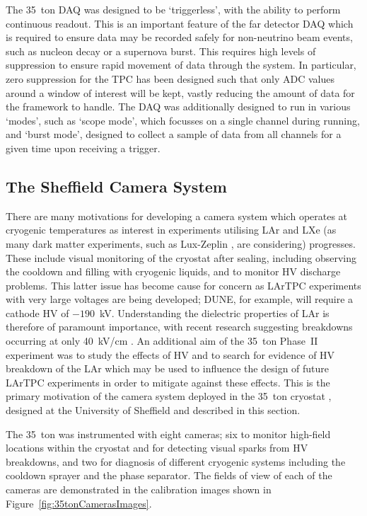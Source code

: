 The 35~ton DAQ was designed to be `triggerless', with the ability to perform continuous readout.  This is an important feature of the far detector DAQ which is required to ensure data may be recorded safely for non-neutrino beam events, such as nucleon decay or a supernova burst.  This requires high levels of suppression to ensure rapid movement of data through the system.  In particular, zero suppression for the TPC has been designed such that only ADC values around a window of interest will be kept, vastly reducing the amount of data for the framework to handle.  The DAQ was additionally designed to run in various `modes', such as `scope mode', which focusses on a single channel during running, and `burst mode', designed to collect a sample of data from all channels for a given time upon receiving a trigger.

\subsection{The Sheffield Camera System}\label{sec:SheffieldCameras}

There are many motivations for developing a camera system which operates at cryogenic temperatures as interest in experiments utilising LAr and LXe (as many dark matter experiments, such as Lux-Zeplin \cite{LZCDR2015}, are considering) progresses.  These include visual monitoring of the cryostat after sealing, including observing the cooldown and filling with cryogenic liquids, and to monitor HV discharge problems.  This latter issue has become cause for concern as LArTPC experiments with very large voltages are being developed; DUNE, for example, will require a cathode HV of $-190$~kV.  Understanding the dielectric properties of LAr is therefore of paramount importance, with recent research suggesting breakdowns occurring at only 40~kV/cm \cite{Blatter2014}.  An additional aim of the 35~ton Phase~II experiment was to study the effects of HV and to search for evidence of HV breakdown of the LAr which may be used to influence the design of future LArTPC experiments in order to mitigate against these effects.  This is the primary motivation of the camera system deployed in the 35~ton cryostat \cite{35tonCameras2017}, designed at the University of Sheffield and described in this section.

The 35~ton was instrumented with eight cameras; six to monitor high-field locations within the cryostat and for detecting visual sparks from HV breakdowns, and two for diagnosis of different cryogenic systems including the cooldown sprayer and the phase separator.  The fields of view of each of the cameras are demonstrated in the calibration images shown in Figure~\ref{fig:35tonCamerasImages}.

